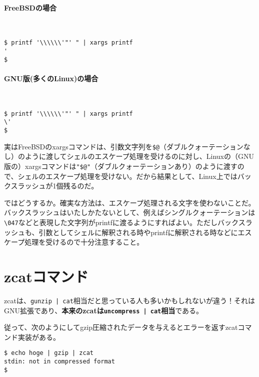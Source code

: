 \paragraph{FreeBSDの場合} 　\\
\begin{screen}
	\verb!$ printf '\\\\\\'"' " | xargs printf! \return \\
	\verb|'|                                            \\
	\verb|$ |
\end{screen}

\paragraph{GNU版(多くのLinux)の場合} 　\\
\begin{screen}
	\verb!$ printf '\\\\\\'"' " | xargs printf! \return \\
	\verb|\'|                                           \\
	\verb|$ |
\end{screen}

実はFreeBSDのxargsコマンドは、引数文字列を\verb|$@|（ダブルクォーテーションなし）のように渡してシェルのエスケープ処理を受けるのに対し、Linuxの（GNU版の）xargsコマンドは\verb|"$@"|（ダブルクォーテーションあり）のように渡すので、シェルのエスケープ処理を受けない。だから結果として、Linux上ではバックスラッシュが1個残るのだ。

ではどうするか。確実な方法は、エスケープ処理される文字を使わないことだ。バックスラッシュはいたしかたないとして、例えばシングルクォーテーションは\verb|\047|などと表現した文字列がprintfに渡るようにすればよい。ただしバックスラッシュも、引数としてシェルに解釈される時やprintfに解釈される時などにエスケープ処理を受けるので十分注意すること。

\section{zcatコマンド}
\label{allenvs:xargs}

zcatは、\verb!gunzip | cat!相当だと思っている人も多いかもしれないが違う！それはGNU拡張であり、\textbf{本来のzcatは\verb!uncompress | cat!相当}である。

従って、次のようにしてgzip圧縮されたデータを与えるとエラーを返すzcatコマンド実装がある。
\begin{screen}
	\verb!$ echo hoge | gzip | zcat! \return \\
	\verb|stdin: not in compressed format|   \\
	\verb|$ |
\end{screen}

